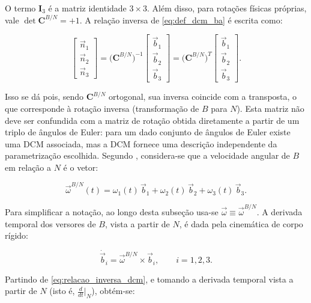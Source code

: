 O termo $\mathbf{I}_3$ é a matriz identidade $3\times 3$.
Além disso, para rotações físicas próprias, vale $\det \mathbf{C}^{B/N} = +1$.
A relação inversa de \eqref{eq:def_dcm_ba} é escrita como:

\begin{equation}
\begin{bmatrix}
\vec{n}_1 \\
\vec{n}_2 \\
\vec{n}_3
\end{bmatrix}
=
\big(\mathbf{C}^{B/N}\big)^{-1}
\begin{bmatrix}
\vec{b}_1 \\
\vec{b}_2 \\
\vec{b}_3
\end{bmatrix}
=
\big(\mathbf{C}^{B/N}\big)^{T}
\begin{bmatrix}
\vec{b}_1 \\
\vec{b}_2 \\
\vec{b}_3
\end{bmatrix}.
\label{eq:relacao_inversa_dcm}
\end{equation}

Isso se dá pois, sendo $\mathbf{C}^{B/N}$ ortogonal, sua inversa coincide com a transposta, o que corresponde à rotação inversa (transformação de $B$ para $N$).
Esta matriz não deve ser confundida com a matriz de rotação obtida diretamente a partir de um triplo de ângulos de Euler: para um dado conjunto de ângulos de Euler existe uma DCM associada, mas a DCM fornece uma descrição independente da parametrização escolhida.
Segundo \cite{wie2008space}, considera-se que a velocidade angular de $B$ em relação a $N$ é o vetor:

\begin{equation}
\vec{\omega}^{B/N}(t)
=
\omega_1(t)\,\vec{b}_1
+
\omega_2(t)\,\vec{b}_2
+
\omega_3(t)\,\vec{b}_3.
\end{equation}

Para simplificar a notação, ao longo desta subseção usa-se $\vec{\omega}\equiv\vec{\omega}^{B/N}$.
A derivada temporal dos versores de $B$, vista a partir de $N$, é dada pela cinemática de corpo rígido:

\begin{equation}
\dot{\vec{b}}_i = \vec{\omega}^{B/N} \times \vec{b}_i,
\qquad i = 1,2,3.
\label{eq:derivada_b_i}
\end{equation}

Partindo de \eqref{eq:relacao_inversa_dcm}, e tomando a derivada temporal vista a partir de $N$ (isto é, $\frac{d}{dt}\big|_N$), obtém-se:


